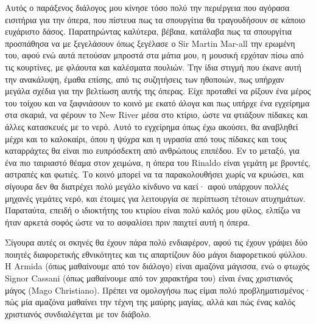 Αυτός ο παράξενος διάλογος μου κίνησε τόσο πολύ την περιέργεια που αγόρασα εισιτήρια για την όπερα, που πίστευα πως τα σπουργίτια θα τραγουδήσουν σε κάποιο ευχάριστο δάσος. Παρατηρώντας καλύτερα, βέβαια, κατάλαβα πως τα σπουργίτια προσπάθησα να με ξεγελάσουν όπως ξεγέλασε ο Sir Martin Mar-all την ερωμένη του, αφού ενώ αυτά πετούσαν μπροστά στα μάτια μου, η μουσική ερχόταν πίσω από τις κουρτίνες, με φλάουτα και καλέσματα πουλιών. Την ίδια στιγμή που έκανε αυτή την ανακάλυψη, έμαθα επίσης, από τις συζητήσεις των ηθοποιών, πως υπήρχαν μεγάλα σχέδια για την βελτίωση αυτής της όπερας. Είχε προταθεί να ρίξουν ένα μέρος του τοίχου και να ξαφνιάσουν το κοινό με εκατό άλογα και πως υπήρχε ένα εγχείρημα στα σκαριά, να φέρουν το New River μέσα στο κτίριο, ώστε να φτιάξουν πίδακες και άλλες κατασκευές με το νερό. Αυτό το εγχείρημα όπως έχω ακούσει, θα αναβληθεί μέχρι και το καλοκαίρι, όπου η ψύχρα και η υγρασία από τους πίδακες και τους καταρράχτες θα είναι πιο ευπρόσδεκτη από ανθρώπους επιπέδου. Εν το μεταξύ, για ένα πιο ταιριαστό θέαμα στον χειμώνα, η όπερα του Rinaldo είναι γεμάτη με βροντές, αστραπές και φωτιές. Το κοινό μπορεί να τα παρακολουθήσει χωρίς να κρυώσει, και σίγουρα δεν θα διατρέχει πολύ μεγάλο κίνδυνο να καεί· αφού υπάρχουν πολλές μηχανές γεμάτες νερό, και έτοιμες για λειτουργία σε περίπτωση τέτοιων ατυχημάτων. Παραταύτα, επειδή ο ιδιοκτήτης του κτιρίου είναι πολύ καλός μου φίλος, ελπίζω να ήταν αρκετά σοφός ώστε να το ασφαλίσει πριν παιχτεί αυτή η όπερα.

Σίγουρα αυτές οι σκηνές θα έχουν πάρα πολύ ενδιαφέρον, αφού τις έχουν γράψει δύο ποιητές διαφορετικής εθνικότητες και τις απαρτίζουν δύο μάγοι διαφορετικού φύλλου. Η Armida (όπως μαθαίνουμε από τον διάλογο) είναι αμαζόνα μάγισσα, ενώ ο φτωχός Signor Cassani (όπως μαθαίνουμε από τον χαρακτήρα του) είναι ένας χριστιανός μάγος (Mago Christiano). Πρέπει να ομολογήσω πως είμαι πολύ προβληματισμένος· πώς μία αμαζόνα μαθαίνει την τέχνη της μαύρης μαγίας, αλλά και πώς ένας καλός χριστιανός συνδιαλέγεται με τον διάβολο.

